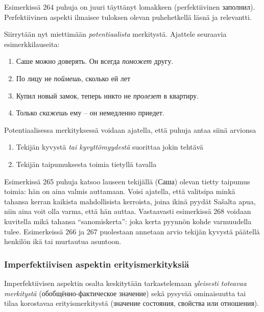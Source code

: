 \documentclass[]{scrartcl}
\providecommand{\tightlist}{%
  \setlength{\itemsep}{0pt}\setlength{\parskip}{0pt}}
\begin{document}
Esimerkissä 264 puhuja on juuri täyttänyt lomakkeen (perfektiivinen
заполнил). Perfektiivinen aspekti ilmaisee tuloksen olevan puhehetkellä
läsnä ja relevantti.

Siirrytään nyt miettimään \emph{potentiaalista} merkitystä. Ajattele
seuraavia esimerkkilauseita:

\begin{enumerate}
\def\labelenumi{(\arabic{enumi})}
\setcounter{enumi}{264}
\tightlist
\item
  Саше можно доверять. Он всегда \emph{поможет} другу.
\item
  По лицу не \emph{поймешь}, сколько ей лет
\item
  Купил новый замок, теперь никто не \emph{пролезет} в квартиру.
\item
  Только \emph{скажешь} ему -- он немедленно приедет.
\end{enumerate}

Potentiaalisessa merkityksessä voidaan ajatella, että puhuja antaa siinä
arvionsa

\begin{enumerate}
\def\labelenumi{\arabic{enumi}.}
\tightlist
\item
  Tekijän kyvystä \emph{tai kyvyttömyydestä} suorittaa jokin tehtävä
\item
  Tekijän taipumuksesta toimia tietyllä tavalla
\end{enumerate}

Esimerkissä 265 puhuja katsoo lauseen tekijällä (Саша) olevan tietty
taipumus toimia: hän on aina valmis auttamaan. Voisi ajatella, että
valitsipa minkä tahansa kerran kaikista mahdollisista kerroista, joina
ikinä pyydät Sašalta apua, niin aina voit olla varma, että hän auttaa.
Vastaavasti esimerkissä 268 voidaan kuvitella mikä tahansa
``sanomiskerta'': joka kerta pyynnön kohde varmuudella tulee.
Esimerkeissä 266 ja 267 puolestaan annetaan arvio tekijän kyvystä
päätellä henkilön ikä tai murtautua asuntoon.

\subsubsection{Imperfektiivisen aspektin
erityismerkityksiä}\label{imperfektiivisen-aspektin-erityismerkityksiuxe4}

Imperfektiivisen aspektin osalta keskitytään tarkastelemaan
\emph{yleisesti toteavaa merkitystä} (обобщённо-фактическое значение)
sekä pysyvää ominaisuutta tai tilaa korostavaa erityismerkitystä
(значение состояния, свойства или отношения).
\end{document}
